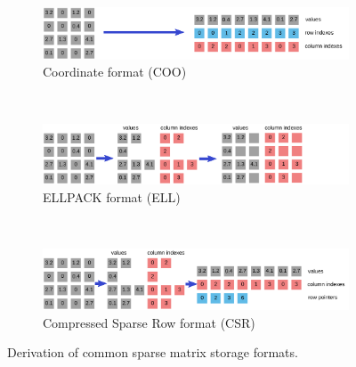 \begin{figure}
\begin{subfigure}{\columnwidth}
\begin{center}
\includegraphics[width=.8\columnwidth]{plots/coo}
\end{center}
\caption{Coordinate format (COO)}
\end{subfigure} \\[2em]
\begin{subfigure}{\columnwidth}
\begin{center}
\includegraphics[width=.8\columnwidth]{plots/ell}
\end{center}
\caption{ELLPACK format (ELL)}
\end{subfigure} \\[2em]
\begin{subfigure}{\columnwidth}
\begin{center}
\includegraphics[width=.8\columnwidth]{plots/csr}
\end{center}
\caption{Compressed Sparse Row format (CSR)}
\end{subfigure}
\caption{Derivation of common sparse matrix storage formats.}
\label{introduction:fig:sparse-formats}
\end{figure}

